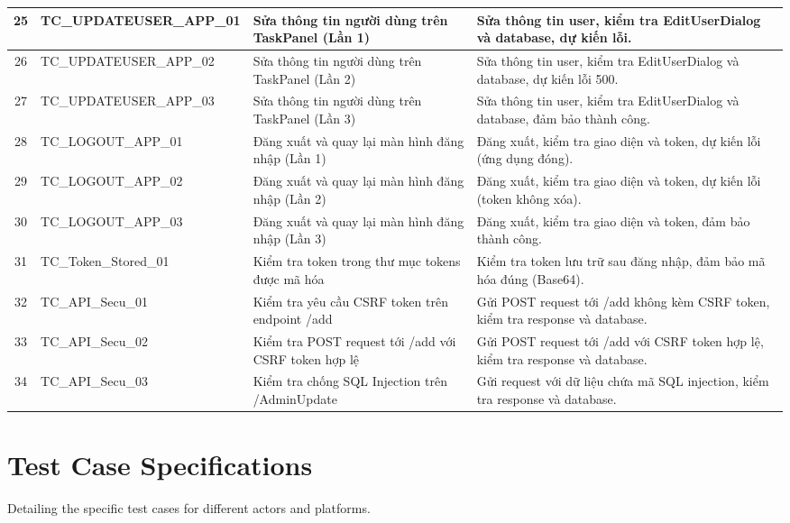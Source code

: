 \documentclass[a4paper,12pt]{article}
\begin{document}
\begin{longtable}{|c|p{2cm}|p{4cm}|p{7cm}|}
    25 & TC_UPDATEUSER_APP_01 & Sửa thông tin người dùng trên TaskPanel (Lần 1) & Sửa thông tin user, kiểm tra EditUserDialog và database, dự kiến lỗi. \\ \hline
    26 & TC_UPDATEUSER_APP_02 & Sửa thông tin người dùng trên TaskPanel (Lần 2) & Sửa thông tin user, kiểm tra EditUserDialog và database, dự kiến lỗi 500. \\ \hline
    27 & TC_UPDATEUSER_APP_03 & Sửa thông tin người dùng trên TaskPanel (Lần 3) & Sửa thông tin user, kiểm tra EditUserDialog và database, đảm bảo thành công. \\ \hline
    28 & TC_LOGOUT_APP_01 & Đăng xuất và quay lại màn hình đăng nhập (Lần 1) & Đăng xuất, kiểm tra giao diện và token, dự kiến lỗi (ứng dụng đóng). \\ \hline
    29 & TC_LOGOUT_APP_02 & Đăng xuất và quay lại màn hình đăng nhập (Lần 2) & Đăng xuất, kiểm tra giao diện và token, dự kiến lỗi (token không xóa). \\ \hline
    30 & TC_LOGOUT_APP_03 & Đăng xuất và quay lại màn hình đăng nhập (Lần 3) & Đăng xuất, kiểm tra giao diện và token, đảm bảo thành công. \\ \hline
    31 & TC_Token_Stored_01 & Kiểm tra token trong thư mục tokens được mã hóa & Kiểm tra token lưu trữ sau đăng nhập, đảm bảo mã hóa đúng (Base64). \\ \hline
    32 & TC_API_Secu_01 & Kiểm tra yêu cầu CSRF token trên endpoint /add & Gửi POST request tới /add không kèm CSRF token, kiểm tra response và database. \\ \hline
    33 & TC_API_Secu_02 & Kiểm tra POST request tới /add với CSRF token hợp lệ & Gửi POST request tới /add với CSRF token hợp lệ, kiểm tra response và database. \\ \hline
    34 & TC_API_Secu_03 & Kiểm tra chống SQL Injection trên /AdminUpdate & Gửi request với dữ liệu chứa mã SQL injection, kiểm tra response và database. \\ \hline
\end{longtable}

\section{Test Case Specifications}
Detailing the specific test cases for different actors and platforms.
\end{document}
